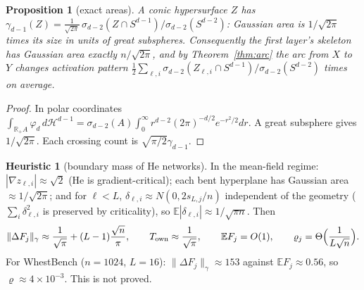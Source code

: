 \documentclass[11pt]{article}
\newtheorem{proposition}[theorem]{Proposition}
\theoremstyle{definition}
\newtheorem{heuristic}[theorem]{Heuristic}
\theoremstyle{remark}
\newcommand{\R}{\mathbb R}
\newcommand{\E}{\mathbb E}
\newcommand{\Hd}{\mathcal H^{d-1}}
\begin{document}
\begin{proposition}[exact areas]\label{prop:area}
A conic hypersurface $Z$ has $\gamma_{d-1}(Z)=\frac1{\sqrt{2\pi}}\,\sigma_{d-2}(Z\cap S^{d-1})/\sigma_{d-2}(S^{d-2})$: Gaussian area is $1/\sqrt{2\pi}$ times its size in units of great subspheres. Consequently the first layer's skeleton has Gaussian area exactly $n/\sqrt{2\pi}$, and by Theorem~\ref{thm:arc} the arc from $X$ to $Y$ changes activation pattern $\frac12\sum_{\ell,i}\sigma_{d-2}(Z_{\ell,i}\cap S^{d-1})/\sigma_{d-2}(S^{d-2})$ times on average.
\end{proposition}

\begin{proof}
In polar coordinates $\int_{\R_+A}\varphi_d\,d\Hd=\sigma_{d-2}(A)\int_0^\infty r^{d-2}(2\pi)^{-d/2}e^{-r^2/2}dr$. A great subsphere gives $1/\sqrt{2\pi}$. Each crossing count is $\sqrt{\pi/2}\gamma_{d-1}$.
\end{proof}

\begin{heuristic}[boundary mass of He networks]\label{heur:mass}
In the mean-field regime: $|\nabla z_{\ell,i}|\approx\sqrt2$ (He is gradient-critical); each bent hyperplane has Gaussian area $\approx1/\sqrt{2\pi}$; and for $\ell<L$, $\delta_{\ell,i}\approx N(0,2s_{L,j}/n)$ independent of the geometry ($\sum_i\delta_{\ell,i}^2$ is preserved by criticality), so $\E|\delta_{\ell,i}|\approx1/\sqrt{\pi n}$. Then
\[\|\Delta F_j\|_\gamma\approx\frac1{\sqrt\pi}+(L-1)\frac{\sqrt n}{\pi},\qquad T_{\rm own}\approx\frac1{\sqrt\pi},\qquad \E F_j=O(1),\qquad \varrho_j=\Theta\Big(\frac1{L\sqrt n}\Big).\]
For WhestBench ($n=1024$, $L=16$): $\|\Delta F_j\|_\gamma\approx153$ against $\E F_j\approx0.56$, so $\varrho\approx4\times10^{-3}$. This is not proved.
\end{heuristic}
\end{document}
